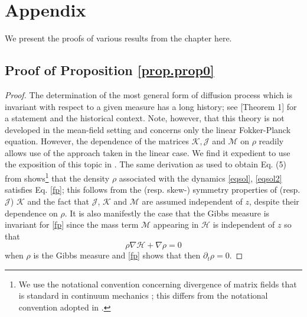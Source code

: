 \documentclass[12pt]{caltech_thesis}
\numberwithin{equation}{section}
\begin{document}
{\section{Appendix}\label{6}
We present the proofs of {various results from the chapter here.}

\subsection{Proof of Proposition \ref{prop.prop0}}
\label{proofprop0}
\begin{proof}
{The determination of the most general form of diffusion process which
is invariant with respect to a given measure has a long history; see
\cite{duncan2017using}[Theorem 1] for a statement 
and the historical context. Note, however, that this theory
is not developed in the mean-field setting and concerns only the
linear Fokker-Planck equation. However, the dependence of the matrices 
$\mathcal{K}, \mathcal{J}$ and $\mathcal{M}$ on $\rho$ readily allows use
of the approach taken in the linear case. We find it expedient to use
the exposition of this topic in \cite{ma2015complete}. The same
derivation as used to obtain Eq. (5) from \cite{ma2015complete} 
shows\footnote{We use the notational convention concerning divergence
of matrix fields that is standard in continuum mechanics \cite{gonzalez2008first};
this differs from the notational convention adopted in \cite{ma2015complete}.}
that the density $\rho$ associated with the dynamics \eqref{eqsol}, \eqref{eqsol2} satisfies Eq. \eqref{fp}; this follows from the (resp. skew-)
symmetry properties of (resp. $\mathcal{J}$) $\mathcal{K}$ and the fact
that $\mathcal{J}$, $\mathcal{K}$ and  $\mathcal{M}$ are assumed independent
of $z$, despite their dependence on $\rho.$ It is also manifestly the case
that the Gibbs measure is invariant for \eqref{fp} since the
mass term $\mathcal{M}$ appearing in $\mathcal{H}$ is independent of $z$ so that
$$\rho\nabla \mathcal{H}+\nabla\rho=0$$
when $\rho$ is the Gibbs measure
and \eqref{fp} shows that then $\partial_t \rho=0.$}
\end{proof}


}
\end{document}
